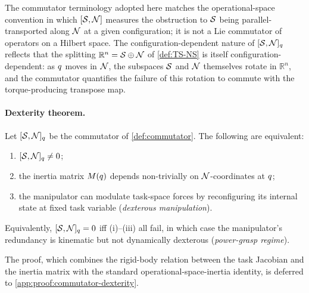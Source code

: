 The commutator terminology adopted here matches the operational-space
convention in which $[\mathcal{S}, \mathcal{N}]$ measures the obstruction to $\mathcal{S}$
being parallel-transported along $\mathcal{N}$ at a given configuration; it
is not a Lie commutator of operators on a Hilbert space. The
configuration-dependent nature of $[\mathcal{S}, \mathcal{N}]_{q}$ reflects
that the splitting $\mathbb{R}^{n} = \mathcal{S} \oplus \mathcal{N}$ of
\cref{def:TS-NS} is itself configuration-dependent: as
$q$ moves in $\mathcal{N}$, the subspaces $\mathcal{S}$ and $\mathcal{N}$
themselves rotate in $\mathbb{R}^{n}$, and the commutator
quantifies the failure of this rotation to commute with the
torque-producing transpose map.

\paragraph{Dexterity theorem.}

\begin{theorem}\label{thm:commutator-dexterity}
Let $[\mathcal{S}, \mathcal{N}]_{q}$ be the commutator of
\cref{def:commutator}. The following are equivalent:
\begin{enumerate}[label=(\roman*),nosep]
  \item $[\mathcal{S}, \mathcal{N}]_{q} \neq 0$;
  \item the inertia matrix $M(q)$ depends non-trivially
        on $\mathcal{N}$-coordinates at $q$;
  \item the manipulator can modulate task-space forces by
        reconfiguring its internal state at fixed task variable
        (\emph{dexterous manipulation}).
\end{enumerate}
Equivalently, $[\mathcal{S}, \mathcal{N}]_{q} = 0$ iff
(i)--(iii) all fail, in which case the manipulator's redundancy
is kinematic but not dynamically dexterous (\emph{power-grasp
regime}).
\end{theorem}

The proof, which combines the rigid-body relation between the
task Jacobian and the inertia matrix with the standard
operational-space-inertia identity, is deferred to
\cref{app:proof:commutator-dexterity}.

